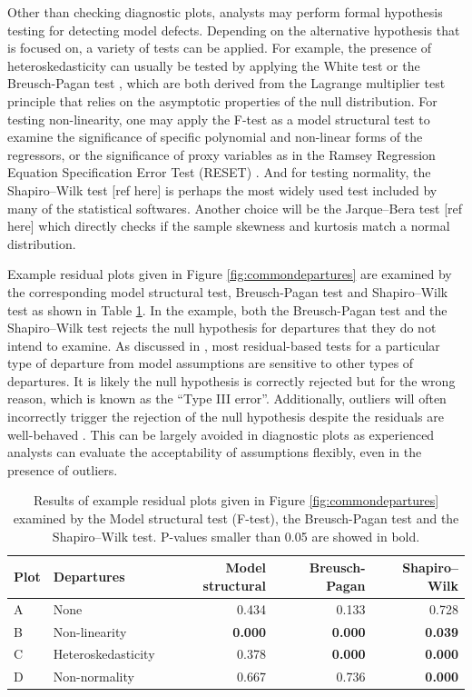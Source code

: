 \documentclass[]{interact}
\theoremstyle{plain}%
\theoremstyle{definition}
\theoremstyle{remark}
\begin{document}
Other than checking diagnostic plots, analysts may perform formal
hypothesis testing for detecting model defects. Depending on the
alternative hypothesis that is focused on, a variety of tests can be
applied. For example, the presence of heteroskedasticity can usually be
tested by applying the White test
\citep{white_heteroskedasticity-consistent_1980} or the Breusch-Pagan
test \citep{breusch_simple_1979}, which are both derived from the
Lagrange multiplier test \citep{silvey1959lagrangian} principle that
relies on the asymptotic properties of the null distribution. For
testing non-linearity, one may apply the F-test as a model structural
test to examine the significance of specific polynomial and non-linear
forms of the regressors, or the significance of proxy variables as in
the Ramsey Regression Equation Specification Error Test (RESET)
\citep{ramsey_tests_1969}. And for testing normality, the Shapiro--Wilk
test {[}ref here{]} is perhaps the most widely used test included by
many of the statistical softwares. Another choice will be the
Jarque--Bera test {[}ref here{]} which directly checks if the sample
skewness and kurtosis match a normal distribution.

Example residual plots given in Figure \ref{fig:commondepartures} are
examined by the corresponding model structural test, Breusch-Pagan test
and Shapiro--Wilk test as shown in Table
\ref{tab:example-residual-plot-table}. In the example, both the
Breusch-Pagan test and the Shapiro--Wilk test rejects the null
hypothesis for departures that they do not intend to examine. As
discussed in \citet{cook1982residuals}, most residual-based tests for a
particular type of departure from model assumptions are sensitive to
other types of departures. It is likely the null hypothesis is correctly
rejected but for the wrong reason, which is known as the ``Type III
error''. Additionally, outliers will often incorrectly trigger the
rejection of the null hypothesis despite the residuals are well-behaved
\citep{cook_applied_1999}. This can be largely avoided in diagnostic
plots as experienced analysts can evaluate the acceptability of
assumptions flexibly, even in the presence of outliers.

\begin{table}

\caption{\label{tab:example-residual-plot-table}Results of example residual plots given in Figure \ref{fig:commondepartures} examined by the Model structural test (F-test), the Breusch-Pagan test and the Shapiro–Wilk test. P-values smaller than 0.05 are showed in bold.}
\centering
\begin{tabular}[t]{llrrr}
\toprule
Plot & Departures & Model structural & Breusch-Pagan & Shapiro–Wilk\\
\midrule
A & None & 0.434 & 0.133 & 0.728\\
B & Non-linearity & \textbf{0.000} & \textbf{0.000} & \textbf{0.039}\\
C & Heteroskedasticity & 0.378 & \textbf{0.000} & \textbf{0.000}\\
D & Non-normality & 0.667 & 0.736 & \textbf{0.000}\\
\bottomrule
\end{tabular}
\end{table}
\end{document}
